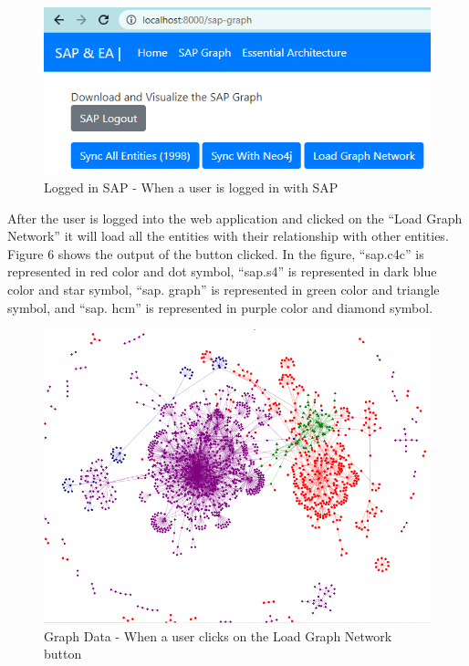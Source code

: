 \documentclass{article}
\begin{document}
\begin{figure}[ht!]
    \centering
    \includegraphics[scale=0.8]{sap-logged-w}
    \caption{Logged in SAP - When a user is logged in with SAP
}
    \label{fig:sap-logged-in}
\end{figure}


After the user is logged into the web application and clicked on the “Load Graph Network” it will load all the entities with their relationship with other entities. Figure 6 shows the output of the button clicked. In the figure, “sap.c4c” is represented in red color and dot symbol, “sap.s4” is represented in dark blue color and star symbol, “sap. graph” is represented in green color and triangle symbol, and “sap. hcm” is represented in purple color and diamond symbol.

\begin{figure}[ht!]
    \centering
    \includegraphics[scale=0.5]{graph-vis}
    \caption{Graph Data - When a user clicks on the Load Graph Network button
}
    \label{fig:graph-visualization}
\end{figure}
\end{document}
